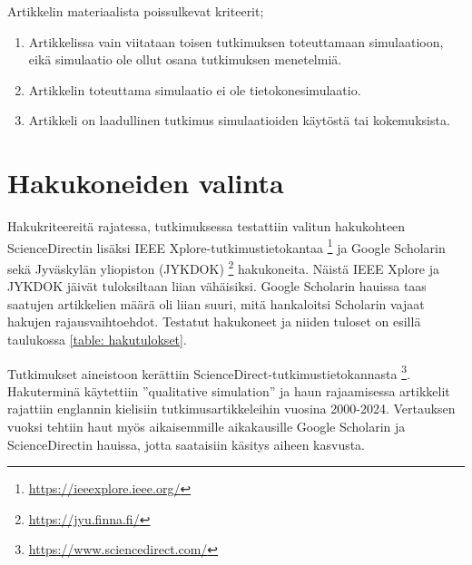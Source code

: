 \documentclass[utf8]{gradu3}
\begin{document}
Artikkelin materiaalista poissulkevat kriteerit;
\begin{enumerate}
    \item Artikkelissa vain viitataan toisen tutkimuksen toteuttamaan simulaatioon, eikä simulaatio ole ollut osana tutkimuksen menetelmiä.
    \item Artikkelin toteuttama simulaatio ei ole tietokonesimulaatio.
    \item Artikkeli on laadullinen tutkimus simulaatioiden käytöstä tai kokemuksista.
\end{enumerate}

\section{Hakukoneiden valinta} \label{hakukoneiden valinta}
Hakukriteereitä rajatessa, tutkimuksessa testattiin valitun hakukohteen ScienceDirectin lisäksi IEEE Xplore-tutkimustietokantaa 
\footnote{\url{https://ieeexplore.ieee.org/}} ja Google Scholarin 
sekä Jyväskylän yliopiston (JYKDOK) \footnote{\url{https://jyu.finna.fi/}} hakukoneita. Näistä IEEE Xplore ja JYKDOK jäivät tuloksiltaan liian vähäisiksi.
Google Scholarin hauissa taas saatujen artikkelien määrä oli liian suuri, 
mitä hankaloitsi Scholarin vajaat hakujen rajausvaihtoehdot. 
Testatut hakukoneet ja niiden tuloset on esillä taulukossa \ref{table: hakutulokset}.

Tutkimukset aineistoon kerättiin ScienceDirect-tutkimustietokannasta \footnote{\url{https://www.sciencedirect.com/}}. 
Hakuterminä käytettiin ''qualitative simulation'' 
ja haun rajaamisessa artikkelit 
rajattiin englannin kielisiin tutkimusartikkeleihin vuosina 2000-2024. 
Vertauksen vuoksi tehtiin haut myös 
aikaisemmille aikakausille Google Scholarin ja ScienceDirectin hauissa,
jotta saataisiin käsitys aiheen kasvusta.
\end{document}
